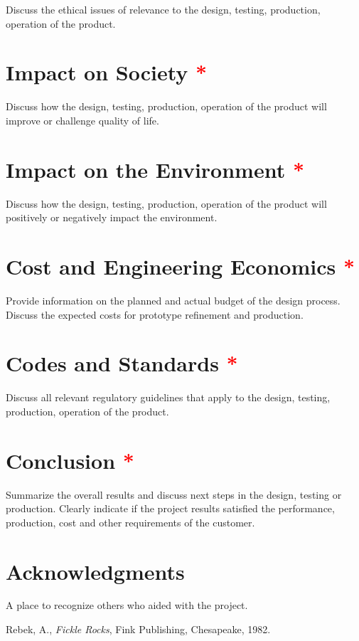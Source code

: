 \documentclass[]{aiaa-tc}%
\newcommand{\reqd}{\textcolor{red}{*}}
\begin{document}
Discuss the ethical issues of relevance to the design, testing, production, operation of the product.

\section{Impact on Society \reqd}

Discuss how the design, testing, production, operation of the product will improve or challenge quality of life.

\section{Impact on the Environment \reqd}

Discuss how the design, testing, production, operation of the product will positively or negatively impact the environment.

\section{Cost and Engineering Economics \reqd}

Provide information on the planned and actual budget of the design process.  Discuss the expected costs for prototype refinement and production.

\section{Codes and Standards \reqd}

Discuss all relevant regulatory guidelines that apply to the design, testing, production, operation of the product.

\section{Conclusion \reqd}

Summarize the overall results and discuss next steps in the design, testing or production.  Clearly indicate if the project results satisfied the performance, production, cost and other requirements of the customer.


\section*{Acknowledgments}

A place to recognize others who aided with the project.

\begin{thebibliography}{9}%
 Rebek, A., {\it Fickle Rocks}, Fink Publishing, Chesapeake, 1982.
\end{thebibliography}
\end{document}
